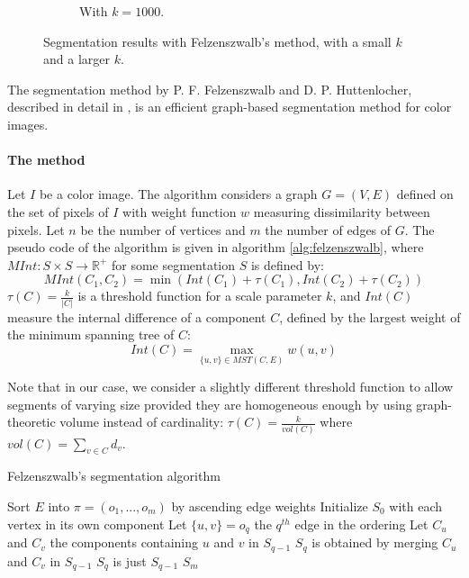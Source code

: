 \begin{figure}[htb!]
\begin{subfigure}{.3\textwidth}
\caption{With $k = 1000$.}
\label{fig:largeKSegmentation}
\end{subfigure}
\caption{Segmentation results with Felzenszwalb's method, with a small $k$ and a larger $k$.}
\end{figure}

The segmentation method by P. F. Felzenszwalb and D. P. Huttenlocher, described in detail in \cite{felzenszwalb2004efficient}, is an efficient graph-based segmentation method for color images.

\paragraph{The method} Let $I$ be a color image. The algorithm considers a graph $G = (V,E)$ defined on the set of pixels of $I$ with weight function $w$ measuring dissimilarity between pixels. Let $n$ be the number of vertices and $m$ the number of edges of $G$. The pseudo code of the algorithm is given in algorithm \autoref{alg:felzenszwalb}, where $MInt : S \times S \rightarrow \mathbb{R}^+$ for some segmentation $S$ is defined by:
\[
MInt(C_1, C_2) = \min(Int(C_1) + \tau(C_1), Int(C_2) + \tau(C_2))
\]
$\tau(C) = \frac{k}{|C|}$ is a threshold function for a scale parameter $k$, and $Int(C)$ measure the internal difference of a component $C$, defined by
the largest weight of the minimum spanning tree of $C$:
\[
Int(C) = \max_{\{u,v\} \in MST(C, E)} w(u,v)
\]

Note that in our case, we consider a slightly different threshold function to allow segments of varying size provided they are homogeneous enough by using graph-theoretic volume instead of cardinality: $\tau(C) = \frac{k}{vol(C)}$ where $vol(C) = \sum_{v \in C} d_v$.

\begin{algorithm}
\caption{Felzenszwalb's segmentation algorithm}
\label{alg:felzenszwalb}

\begin{algorithmic}[1]
\State Sort $E$ into $\pi = (o_1, ..., o_m)$ by ascending edge weights
\State Initialize $S_0$ with each vertex in its own component
\State Let $\{u,v\} = o_q$ the $q^{th}$ edge in the ordering
\State Let $C_u$ and $C_v$ the components containing $u$ and $v$ in $S_{q-1}$
\State $S_q$ is obtained by merging $C_u$ and $C_v$ in $S_{q-1}$
\Else
\State $S_q$ is just $S_{q-1}$
\EndIf
\EndFor
\Return $S_m$
\EndFunction
\end{algorithmic}
\end{algorithm}

